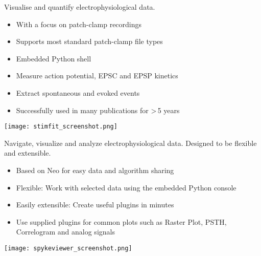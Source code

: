 \begin{multicols}{3}



Visualise and quantify electrophysiological data.
\begin{itemize}[nolistsep,topsep=0em,leftmargin=1pc]
\item With a focus on patch-clamp recordings
\item Supports most standard patch-clamp file types
\item Embedded Python shell
\item Measure action potential, EPSC and EPSP kinetics
\item Extract spontaneous and evoked events
\item Successfully used in many publications for >\,5 years
\end{itemize}
\texttt{[image: stimfit\_screenshot.png]}



Navigate, visualize and analyze electrophysiological data. Designed to be flexible and extensible.

\begin{itemize}[nolistsep,topsep=0em,leftmargin=1pc]
\item Based on Neo for easy data and algorithm sharing
\item Flexible: Work with selected data using the embedded Python console
\item Easily extensible: Create useful plugins in minutes
\item Use supplied plugins for common plots such as Raster Plot, PSTH, Correlogram and analog signals
\end{itemize}
\texttt{[image: spykeviewer\_screenshot.png]}


\end{multicols}

